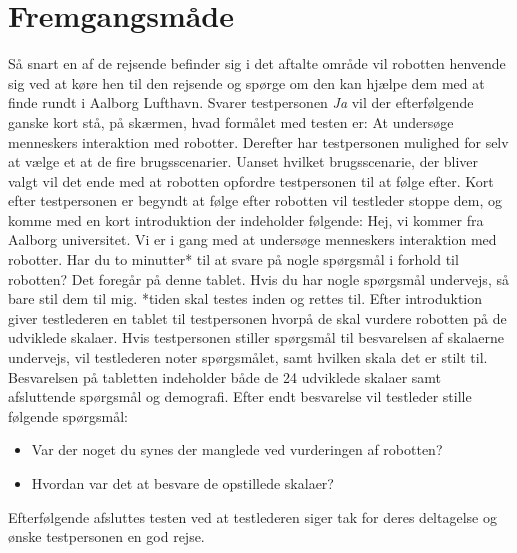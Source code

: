 \section{Fremgangsmåde}
\label{TestAfSkalaFremgangsmaade}
%
Så snart en af de rejsende befinder sig i det aftalte område vil robotten henvende sig ved at køre hen til den rejsende og spørge om den kan hjælpe dem med at finde rundt i Aalborg Lufthavn. Svarer testpersonen \textit{Ja} vil der efterfølgende ganske kort stå, på skærmen, hvad formålet med testen er: At undersøge menneskers interaktion med robotter.
Derefter har testpersonen mulighed for selv at vælge et at de fire brugsscenarier. Uanset hvilket brugsscenarie, der bliver valgt vil det ende med at robotten opfordre testpersonen til at følge efter. Kort efter testpersonen er begyndt at følge efter robotten vil testleder stoppe dem, og komme med en kort introduktion der indeholder følgende: 
%
Hej, vi kommer fra Aalborg universitet. Vi er i gang med at undersøge menneskers interaktion med robotter. Har du to minutter* til at svare på nogle spørgsmål i forhold til robotten? Det foregår på denne tablet. Hvis du har nogle spørgsmål undervejs, så bare stil dem til mig. *tiden skal testes inden og rettes til.\blankline
%
Efter introduktion giver testlederen en tablet til testpersonen hvorpå de skal vurdere robotten på de udviklede skalaer. Hvis testpersonen stiller spørgsmål til besvarelsen af skalaerne undervejs, vil testlederen noter spørgsmålet, samt hvilken skala det er stilt til. \blankline
%
Besvarelsen på tabletten indeholder både de 24 udviklede skalaer samt afsluttende spørgsmål og demografi. \blankline
%
Efter endt besvarelse vil testleder stille følgende spørgsmål: 
\begin{itemize}
	\item Var der noget du synes der manglede ved vurderingen af robotten? 
	\item Hvordan var det at besvare de opstillede skalaer? 
\end{itemize} \blankline
%
Efterfølgende afsluttes testen ved at testlederen siger tak for deres deltagelse og ønske testpersonen en god rejse.